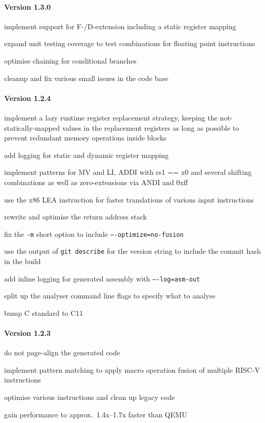 \paragraph{Version 1.3.0}
\begin{itemize*}
 	\item implement support for F-/D-extension including a static register mapping
 	\item expand unit testing coverage to test combinations for floating point instructions
 	\item optimise chaining for conditional branches
 	\item cleanup and fix various small issues in the code base
\end{itemize*}


\paragraph{Version 1.2.4}
\begin{itemize*}
 	\item implement a lazy runtime register replacement strategy, keeping the not-statically-mapped values in the replacement registers as long as possible to prevent redundant memory operations inside blocks
 	\item add logging for static and dynamic register mapping
 	\item implement patterns for MV and LI, ADDI with rs1 == x0 and several shifting combinations as well as zero-extensions via ANDI and 0xff
 	\item use the x86 LEA instruction for faster translations of various input instructions
 	\item rewrite and optimise the return address stack
 	\item fix the \texttt{-m} short option to include \texttt{----optimize=no-fusion}
 	\item use the output of \texttt{git describe} for the version string to include the commit hash in the build
 	\item add inline logging for generated assembly with \texttt{----log=asm-out}
 	\item split up the analyser command line flags to specify what to analyse
 	\item bump C standard to C11
\end{itemize*}


\paragraph{Version 1.2.3}
\begin{itemize*}
 	\item do not page-align the generated code
 	\item implement pattern matching to apply macro operation fusion of multiple RISC-V instructions
 	\item optimise various instructions and clean up legacy code
 	\item gain performance to approx.\ 1.4x--1.7x faster than QEMU
\end{itemize*}


